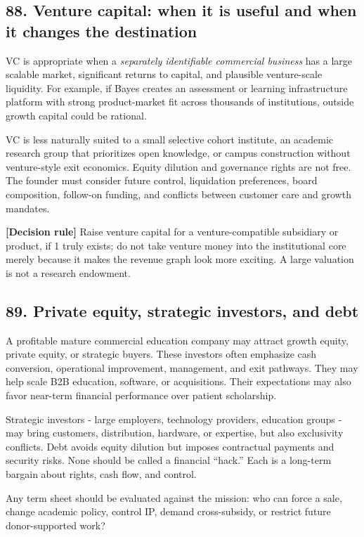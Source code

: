 \subsection{88. Venture capital: when it is useful and when it changes the destination}

VC is appropriate when a \textit{separately identifiable commercial business} has a large scalable market, significant returns to capital, and plausible venture-scale liquidity. For example, if Bayes creates an assessment or learning infrastructure platform with strong product-market fit across thousands of institutions, outside growth capital could be rational.

VC is less naturally suited to a small selective cohort institute, an academic research group that prioritizes open knowledge, or campus construction without venture-style exit economics. Equity dilution and governance rights are not free. The founder must consider future control, liquidation preferences, board composition, follow-on funding, and conflicts between customer care and growth mandates.

\textbf{\textbf{[Decision rule]}} Raise venture capital for a venture-compatible subsidiary or product, if 1 truly exists; do not take venture money into the institutional core merely because it makes the revenue graph look more exciting. A large valuation is not a research endowment.

\subsection{89. Private equity, strategic investors, and debt}

A profitable mature commercial education company may attract growth equity, private equity, or strategic buyers. These investors often emphasize cash conversion, operational improvement, management, and exit pathways. They may help scale B2B education, software, or acquisitions. Their expectations may also favor near-term financial performance over patient scholarship.

Strategic investors - large employers, technology providers, education groups - may bring customers, distribution, hardware, or expertise, but also exclusivity conflicts. Debt avoids equity dilution but imposes contractual payments and security risks. None should be called a financial ``hack.'' Each is a long-term bargain about rights, cash flow, and control.

Any term sheet should be evaluated against the mission: who can force a sale, change academic policy, control IP, demand cross-subsidy, or restrict future donor-supported work?

